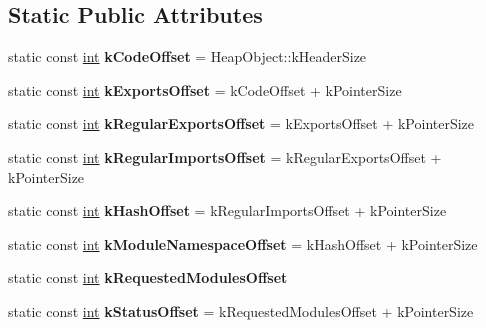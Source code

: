 \subsection*{Static Public Attributes}
\begin{DoxyCompactItemize}
\item 
\mbox{\label{classv8_1_1internal_1_1Module_a72f89b9117bfaef3b72016e28f120b7c}} 
static const \mbox{\hyperlink{classint}{int}} {\bfseries k\+Code\+Offset} = Heap\+Object\+::k\+Header\+Size
\item 
\mbox{\label{classv8_1_1internal_1_1Module_a52c14eebd22781512556092cad0f548c}} 
static const \mbox{\hyperlink{classint}{int}} {\bfseries k\+Exports\+Offset} = k\+Code\+Offset + k\+Pointer\+Size
\item 
\mbox{\label{classv8_1_1internal_1_1Module_a1e78068943cdc06af607f8fffe6739ff}} 
static const \mbox{\hyperlink{classint}{int}} {\bfseries k\+Regular\+Exports\+Offset} = k\+Exports\+Offset + k\+Pointer\+Size
\item 
\mbox{\label{classv8_1_1internal_1_1Module_a8196862f1f85f330daa0086628f79b40}} 
static const \mbox{\hyperlink{classint}{int}} {\bfseries k\+Regular\+Imports\+Offset} = k\+Regular\+Exports\+Offset + k\+Pointer\+Size
\item 
\mbox{\label{classv8_1_1internal_1_1Module_ac55428ad602036aa911a969bec6b91ec}} 
static const \mbox{\hyperlink{classint}{int}} {\bfseries k\+Hash\+Offset} = k\+Regular\+Imports\+Offset + k\+Pointer\+Size
\item 
\mbox{\label{classv8_1_1internal_1_1Module_acc7ed09c625db6ed33c3bc29edd90e81}} 
static const \mbox{\hyperlink{classint}{int}} {\bfseries k\+Module\+Namespace\+Offset} = k\+Hash\+Offset + k\+Pointer\+Size
\item 
static const \mbox{\hyperlink{classint}{int}} {\bfseries k\+Requested\+Modules\+Offset}
\item 
\mbox{\label{classv8_1_1internal_1_1Module_a217ef3bea7ef3cd754661b9432082fb4}} 
static const \mbox{\hyperlink{classint}{int}} {\bfseries k\+Status\+Offset} = k\+Requested\+Modules\+Offset + k\+Pointer\+Size

\end{DoxyCompactItemize}
